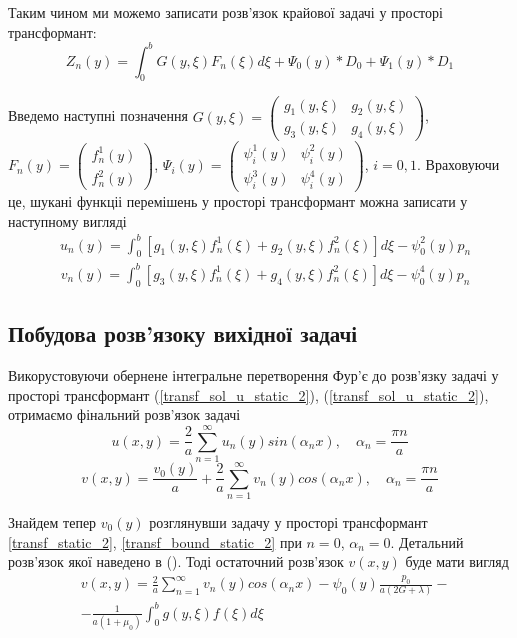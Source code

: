 Таким чином ми можемо записати розв'язок крайової задачі у просторі трансформант:
\begin{equation}
    Z_n(y) = \int_0^b G(y,\xi) F_n(\xi) d\xi + \Psi_0(y) * D_0 + \Psi_1(y) * D_1
\end{equation}

Введемо наступні позначення $G(y, \xi) = \begin{pmatrix}
    g_1(y,\xi) & g_2(y,\xi) \\
    g_3(y,\xi) & g_4(y,\xi)
\end{pmatrix}$, $F_n(y) = \begin{pmatrix}
    f_n^1(y) \\
    f_n^2(y)
\end{pmatrix}$, $\Psi_i(y) = \begin{pmatrix}
    \psi_i^1(y) & \psi_i^2(y) \\
    \psi_i^3(y) & \psi_i^4(y)
\end{pmatrix}$, $i=0,1$. Враховуючи це, шукані функціі перемішень у просторі трансформант можна записати у наступному вигляді
\begin{align}\label{transf_sol_u_static_2}
    &u_n(y) = \int_0^b \left[g_1(y, \xi)f_n^1(\xi) + g_2(y, \xi)f_n^2(\xi) \right]d\xi - \psi_0^2(y) p_n
\end{align}
\begin{align}\label{transf_sol_v_static_2}
    &v_n(y) = \int_0^b \left[g_3(y, \xi)f_n^1(\xi) + g_4(y, \xi)f_n^2(\xi) \right]d\xi - \psi_0^4(y) p_n
\end{align}

\subsection{Побудова розв'язоку вихідної задачі}
Викорустовуючи обернене інтегральне перетворення Фур'є до розв'язку задачі у просторі трансформант
(\ref{transf_sol_u_static_2}), (\ref{transf_sol_u_static_2}), отримаємо фінальний розв'язок задачі
\begin{equation}
    u(x,y) = \frac{2}{a} \sum_{n=1}^{\infty} u_n(y) sin(\alpha_n x), \quad \alpha_n = \frac{\pi n}{a}
\end{equation}
\begin{equation}
    v(x,y) = \frac{v_0(y)}{a} + \frac{2}{a} \sum_{n=1}^{\infty} v_n(y) cos(\alpha_n x), \quad \alpha_n = \frac{\pi n}{a}
\end{equation}

Знайдем тепер $v_0(y)$ розглянувши задачу у просторі трансформант \eqref{transf_static_2}, \eqref{transf_bound_static_2} при $n=0$, $\alpha_n = 0$.
Детальний розв'язок якої наведено в (). Тоді остаточний розв'язок $v(x,y)$ буде мати вигляд
\begin{align}
    &v(x,y) = \frac{2}{a} \sum_{n=1}^{\infty} v_n(y) cos(\alpha_n x) - \psi_0(y) \frac{p_0}{a(2G + \lambda)} - \\
    &- \frac{1}{a(1+\mu_0)} \int_{0}^{b}g(y,\xi) f(\xi) d\xi
\end{align}